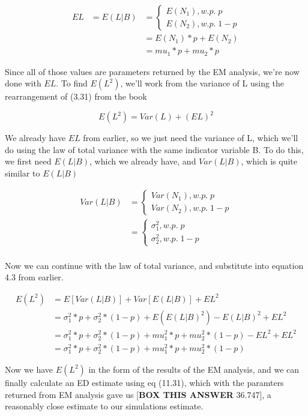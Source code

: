 \documentclass[letter]{article}
\begin{document}
\begin{equation}
\begin{aligned}
	EL &= E(L | B) &=  	\begin{cases}
					E(N_1),  w.p. \; p \\
					E(N_2),  w.p. \;1-p
				\end{cases}  \\
	&&= E(N_1) * p + E(N_2) \\
	&&= mu_1 * p + mu_2 * p
\end{aligned}
\end{equation}

Since all of those values are parameters returned by the EM analysis, we're now done with $EL$. To find $E(L^2)$, we'll work from the variance of L using the rearrangement of (3.31) from the book

\begin{equation}
	E(L^2) = Var(L) + (EL)^2
\end{equation}

We already have $EL$ from earlier, so we just need the variance of L, which we'll do using the law of total variance with the same indicator variable B. To do this, we first need $E(L|B)$, which we already have, and $Var(L|B)$, which is quite similar to $E(L|B)$

\begin{equation}
\begin{aligned}
	Var(L | B) &=  	\begin{cases}
					Var(N_1),  w.p. \; p \\
					Var(N_2),  w.p. \;1-p
				\end{cases}  \\
		&=		\begin{cases}
					\sigma_1^2,  w.p. \; p \\
					\sigma_2^2,  w.p. \;1-p
				\end{cases}  \\
\end{aligned}
\end{equation}

Now we can continue with the law of total variance, and substitute into equation 4.3 from earlier.

\begin{equation}
\begin{aligned}
	E(L^2) &=  E[Var(L | B)] + Var[E(L|B)] + EL^2 \\
		&= \sigma_1^2 * p + \sigma_2^2 * (1-p) + E(E(L|B)^2) -  E(L|B)^2 + EL^2 \\
		&= \sigma_1^2 * p + \sigma_2^2 * (1-p) + mu_1^2 * p + mu_2^2 * (1-p) -  EL^2 + EL^2 \\
		&= \sigma_1^2 * p + \sigma_2^2 * (1-p) + mu_1^2 * p + mu_2^2 * (1-p)
\end{aligned}
\end{equation}

Now we have $E(L^2)$ in the form of the results of the EM analysis, and we can finally calculate an ED estimate using eq (11.31), which with the paramters returned from EM analysis gave us [\textbf{BOX THIS ANSWER} 36.747], a reasonably close estimate to our simulations estimate.
\end{document}
